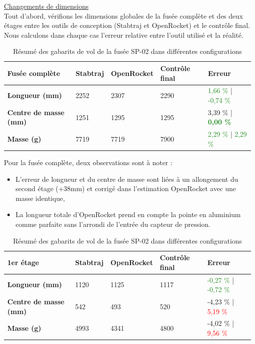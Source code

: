 \underline{Changements de dimensions}\\
Tout d'abord, vérifions les dimensions globales de la fusée complète et des deux étages entre les outils de conception (Stabtraj et OpenRocket) et le contrôle final.
Nous calculons dans chaque cas l'erreur relative entre l'outil utilisé et la réalité.\\
\begin{table}[h!]
    \centering
    \begin{tabular}{|l|l|l|l|l|}
        \hline
        \textbf{Fusée complète} & \textbf{Stabtraj} & \textbf{OpenRocket} & \textbf{Contrôle final} & \textbf{Erreur} \\
        \hline
        \textbf{Longueur (mm)} & 2252 & 2307 & 2290 & \textcolor{ForestGreen}{1,66 \%} | \textcolor{ForestGreen}{-0,74 \%}\\
        \hline
        \textbf{Centre de masse (mm)} & 1251 & 1295 & 1295 & \textcolor{YellowOrange}{3,39 \%} | \textcolor{ForestGreen}{\textbf{0,00 \%}}\\
        \hline
        \textbf{Masse (g)} & 7719 & 7719 & 7900 & \textcolor{ForestGreen}{2,29 \%} | \textcolor{ForestGreen}{2,29 \%} \\
        \hline
    \end{tabular}
    \caption{Résumé des gabarits de vol de la fusée SP-02 dans différentes configurations}
    \label{tab:gabarits_vol}
\end{table}

Pour la fusée complète, deux observations sont à noter :
\begin{itemize}
    \item L'erreur de longueur et du centre de masse sont liées à un allongement du second étage (+38mm) et corrigé dans l'estimation OpenRocket avec une masse identique,
    \item La longueur totale d'OpenRocket prend en compte la pointe en aluminium comme parfaite sans l'arrondi de l'entrée du capteur de pression.
\end{itemize}
\begin{table}[h!]
    \centering
    \begin{tabular}{|l|l|l|l|l|}
        \hline
        \textbf{1er étage} & \textbf{Stabtraj} & \textbf{OpenRocket} & \textbf{Contrôle final} & \textbf{Erreur} \\
        \hline
        \textbf{Longueur (mm)} & 1120 & 1125 & 1117 & \textcolor{ForestGreen}{-0,27 \%} | \textcolor{ForestGreen}{-0,72 \%}\\
        \hline
        \textbf{Centre de masse (mm)} & 542 & 493 & 520 & \textcolor{YellowOrange}{-4,23 \%} | \textcolor{Red}{5,19 \%}\\
        \hline
        \textbf{Masse (g)} & 4993 & 4341 & 4800 & \textcolor{YellowOrange}{-4,02 \%} | \textcolor{Red}{9,56 \%} \\
        \hline
    \end{tabular}
    \caption{Résumé des gabarits de vol de la fusée SP-02 dans différentes configurations}
    \label{tab:gabarits_vol}
\end{table}

